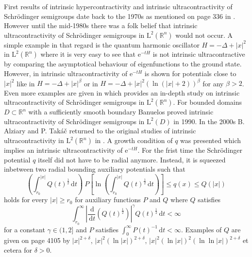 \documentclass[12pt,longbibliography]{article}
\def\R{\mathbb{R}}
\def\d{\,\mathrm{d}}
\theoremstyle{definition}
\theoremstyle{remark}
\theoremstyle{example}
\begin{document}
First results of intrinsic hypercontractivity and intrinsic ultracontractivity of Schrödinger semigroups date back to the 1970s
as mentioned on page 336 in \cite{DaviesSimon84}. However until the mid-1980s 
there was a folk belief that intrinsic ultracontractivity of Schrödinger semigroups in $\mathrm{L}^{2}(\R^{n})$ would not occur. 
A simple example in that regard is the quantum harmonic oscillator $H=-\Delta + |x|^{2}$ in $\mathrm{L}^{2}(\R^{n})$ where it 
is very easy to see that $\mathrm{e}^{-tH}$ is not intrinsic ultracontractive by 
comparing the asymptotical behaviour of eigenfunctions to the ground state. 
However, in \cite{DaviesSimon84}  intrinsic ultracontractivity of $\mathrm{e}^{-tH}$ is shown
for potentials close to $|x|^{2}$ like in
$H=-\Delta + |x|^{\beta}$ or in $H=-\Delta + |x|^{2} \left( \ln(|x|+2)\right)^{\beta}$ for any $\beta > 2$. 
Even more examples are given in \cite{Davies07} which provides 
an in-depth study on intrinsic ultracontractivity of Schrödinger semigroups in $\mathrm{L}^{2}(\R^{n})$.
For bounded domains $D \subset \R^{n}$ with a sufficiently smooth boundary Banuelos  \cite{BANUELOS1991} proved 
intrinsic ultracontractivity of Schrödinger semigroups in $\mathrm{L}^{2}(D)$ in 1990. 
In the 2000s B. Alziary and P. Takáč returned to the original studies of intrinsic ultracontractivity 
in $\mathrm{L}^{2}(\R^{n})$ in \cite{AlziaryTakac09}. A growth condition of $q$ was presented which implies an 
intrinsic ultracontractivity of $\mathrm{e}^{-tH}$. For the frist time the Schrödinger potential $q$ itself did not have to be 
radial anymore. Instead, 
it is squeezed inbetween two radial bounding auxiliary potentials such that
\begin{equation}\label{Takac_boundary}
\left( \int_{r_{0}}^{|x|} Q(t)^{\frac{1}{2}} \d t \right) \ P \left[ \ln \left( \int_{r_{0}}^{|x|} Q(t)^{\frac{1}{2}} \d t  \right) \right]
\leq q(x) \leq Q\left( |x| \right)
\end{equation}
holds for every $|x| \geq r_{0}$ for auxiliary functions $P$ and $Q$ where $Q$ satisfies
\begin{equation}\label{condition_Q_Hartman_Wintner}
\int_{r_{0}}^{\infty} \left| \frac{\d}{\d t} \left( Q(t)^{\frac{1}{2}} \right)  \right|^{\gamma} Q(t)^{\frac{1}{2}} \d t < \infty
\end{equation}
for a constant $\gamma \in (1,2]$ and $P$ satisfies $\int_{0}^{\infty} P(t)^{-1} \d t < \infty$. Examples of $Q$ are given on 
page 4105 by $|x|^{2+\delta}$, $|x|^{2} \left( \ln |x| \right)^{2+\delta}$, 
$|x|^{2}  \left( \ln |x| \right)^{2} \left( \ln \ln |x| \right)^{2+\delta}$ et cetera for $\delta > 0$. 
\end{document}
